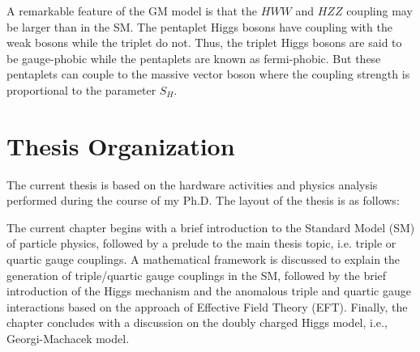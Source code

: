 A remarkable feature of the GM model is that the $HWW$ and $HZZ$ coupling may be larger than in the SM. 
The pentaplet Higgs bosons have coupling with the weak bosons while the triplet do not. Thus, the triplet Higgs bosons are said to be gauge-phobic while the pentaplets are known as fermi-phobic.
But these pentaplets can couple to the massive vector boson where the coupling strength is proportional to the parameter $S_H$.










\section{Thesis Organization} %
\label{sec:thesis_organization}
The current thesis is based on the hardware activities and physics analysis performed during the course of my Ph.D. The layout of the thesis is as follows:


The current chapter begins with a brief introduction to the Standard Model (SM) of particle physics, followed by a prelude to the main thesis topic, i.e. triple or quartic gauge couplings. A mathematical framework is discussed to explain the generation of triple/quartic gauge couplings in the SM, followed by the brief introduction of the Higgs mechanism and the anomalous triple and quartic gauge interactions based on the approach of Effective Field Theory (EFT). Finally, the chapter concludes with a discussion on the doubly charged Higgs model, i.e., Georgi-Machacek model.


